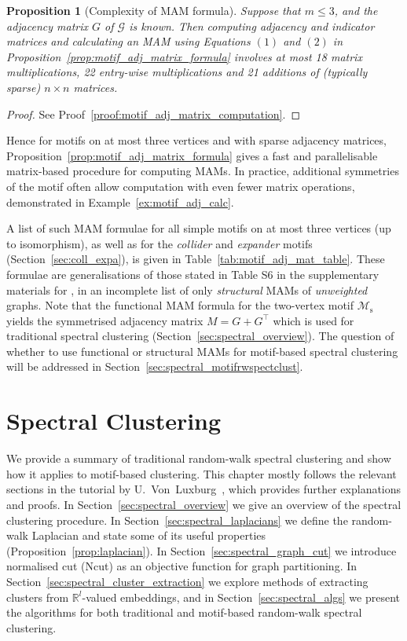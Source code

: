 \documentclass[12pt,draft]{ociamthesis}
\theoremstyle{plain}
\newtheorem{proposition}{Proposition}[chapter]
\theoremstyle{definition}
\theoremstyle{remark}
\newcommand\bb[1]{\mathbb{#1}}
\newcommand\ca[1]{\mathcal{#1}}
\begin{document}
\begin{proposition}[Complexity of MAM formula]
  \label{prop:motif_adj_matrix_computation}
  Suppose that ${m \leq 3}$, and the adjacency matrix $G$ of $\ca{G}$ is known.
  Then computing adjacency and indicator matrices and calculating an MAM using
  Equations $(1)$ and $(2)$ in Proposition~\ref{prop:motif_adj_matrix_formula}
  involves at most 18 matrix multiplications, 22 entry-wise multiplications and
  21 additions of (typically sparse) $n \times n$ matrices.
\end{proposition}

\begin{proof}
  See Proof~\ref{proof:motif_adj_matrix_computation}.
\end{proof}

Hence for motifs on at most three vertices and with sparse adjacency matrices,
Proposition~\ref{prop:motif_adj_matrix_formula} gives a fast and parallelisable
matrix-based procedure for computing MAMs. In practice, additional symmetries
of the motif often allow computation with even fewer matrix operations,
demonstrated in Example~\ref{ex:motif_adj_calc}.

A list of such MAM formulae for all simple motifs on at most three vertices (up
to isomorphism), as well as for the \emph{collider} and \emph{expander} motifs
(Section~\ref{sec:coll_expa}), is given in Table~\ref{tab:motif_adj_mat_table}.
These formulae are generalisations of those stated in Table S6 in the
supplementary materials for \cite{benson2016higher}, in an incomplete list of
only \emph{structural} MAMs of \emph{unweighted} graphs. Note that the
functional MAM formula for the two-vertex motif $\ca{M}_\mathrm{s}$ yields the
symmetrised adjacency matrix $M = G + G^\top$ which is used for traditional
spectral clustering (Section~\ref{sec:spectral_overview}). The question of
whether to use functional or structural MAMs for motif-based spectral
clustering will be addressed in Section~\ref{sec:spectral_motifrwspectclust}.

\clearpage{}
\clearpage{}
\chapter{Spectral Clustering} \label{chap:spectral}

We provide a summary of traditional random-walk spectral clustering and show
how it applies to motif-based clustering.
This chapter mostly follows the relevant sections in the tutorial by
U.~Von~Luxburg~\cite{von2007tutorial}, which provides further explanations and
proofs.
In Section~\ref{sec:spectral_overview} we give an overview of the spectral
clustering procedure.
In Section~\ref{sec:spectral_laplacians} we define the random-walk Laplacian
and state some of its useful properties (Proposition~\ref{prop:laplacian}).
In Section~\ref{sec:spectral_graph_cut} we introduce normalised cut (Ncut) as
an objective function for graph partitioning.
In Section~\ref{sec:spectral_cluster_extraction} we explore methods of
extracting clusters from $\bb{R}^l$-valued embeddings, and in
Section~\ref{sec:spectral_algs} we present the algorithms for both traditional
and motif-based random-walk spectral clustering.
\end{document}
